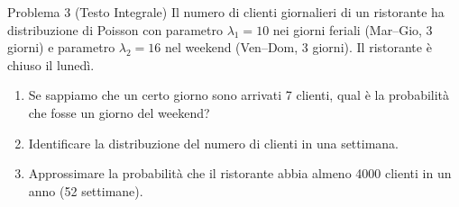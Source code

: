 \documentclass[11pt,a4paper]{article}
\begin{document}
\begin{problemabox}{Problema 3 (Testo Integrale)}
Il numero di clienti giornalieri di un ristorante ha distribuzione di Poisson con parametro $\lambda_1 = 10$ nei giorni feriali (Mar--Gio, 3 giorni) e parametro $\lambda_2 = 16$ nel weekend (Ven--Dom, 3 giorni). Il ristorante è chiuso il lunedì.
\begin{enumerate}[label=(\alph*)]
    \item Se sappiamo che un certo giorno sono arrivati 7 clienti, qual è la probabilità che fosse un giorno del weekend?
    \item Identificare la distribuzione del numero di clienti in una settimana.
    \item Approssimare la probabilità che il ristorante abbia almeno 4000 clienti in un anno (52 settimane).
\end{enumerate}
\end{problemabox}
\end{document}
